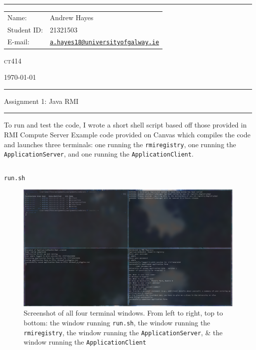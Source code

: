 \documentclass[a4paper]{article}
\newenvironment{code}{\captionsetup{type=listing}}{}
\begin{document}
\hrule \medskip
\begin{minipage}{0.295\textwidth} 
    \raggedright
    \footnotesize 
    \begin{tabular}{@{}l l}
        Name: & Andrew Hayes \\
        Student ID: & 21321503 \\
        E-mail: & \href{mailto://a.hayes18@universityofgalway.ie}{\texttt{a.hayes18@universityofgalway.ie}} \\
    \end{tabular}
\end{minipage}
\begin{minipage}{0.4\textwidth} 
    \centering 
    \vspace{0.4em}
    \LARGE
    \textsc{ct414} \\ 
\end{minipage}
\begin{minipage}{0.295\textwidth} 
    \raggedleft
    \today
\end{minipage}
\medskip\hrule 
\begin{center}
    \normalsize
    Assignment 1: Java RMI
\end{center}
\hrule
\medskip

To run and test the code, I wrote a short shell script based off those provided in RMI Compute Server Example code provided on Canvas which compiles the code and launches three terminals: one running the \texttt{rmiregistry}, one running the \texttt{ApplicationServer}, and one running the \texttt{ApplicationClient}.

\begin{code}
\inputminted[texcl, mathescape, linenos, breaklines, frame=single]{shell}{../code/src/run.sh}
\caption{\texttt{run.sh}}
\end{code}

\begin{figure}[H]
    \centering
    \includegraphics[width=\textwidth]{./images/screenshot.png}
    \caption{Screenshot of all four terminal windows. From left to right, top to bottom: the window running \texttt{run.sh}, the window running the \texttt{rmiregistry}, the window running the \texttt{ApplicationServer}, \& the window running the \texttt{ApplicationClient}}
\end{figure}
\end{document}
